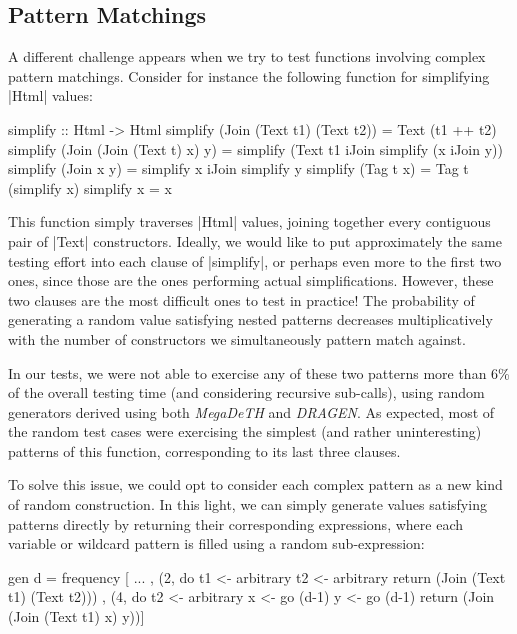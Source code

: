 %
\subsection{Pattern Matchings}

A different challenge appears when we try to test functions involving complex
pattern matchings. Consider for instance the following function for simplifying
|Html| values:

\begin{code}
simplify :: Html -> Html
simplify (Join (Text t1) (Text t2)) = Text (t1 ++ t2)
simplify (Join (Join (Text t) x) y)
  = simplify (Text t1 iJoin simplify (x iJoin y))
simplify (Join x y) = simplify x iJoin simplify y
simplify (Tag t x) = Tag t (simplify x)
simplify x = x
\end{code}
%
This function simply traverses |Html| values, joining together every contiguous
pair of |Text| constructors.
%
Ideally, we would like to put approximately the same testing effort into each
clause of |simplify|, or perhaps even more to the first two ones, since those
are the ones performing actual simplifications.
%
However, these two clauses are the most difficult ones to test in practice!
%
The probability of generating a random value satisfying nested patterns
decreases multiplicatively with the number of constructors we simultaneously
pattern match against.


In our tests, we were not able to exercise any of these two patterns more than
6\% of the overall testing time (and considering recursive sub-calls), using
random generators derived using both \emph{MegaDeTH} and \emph{DRAGEN}.
%
As expected, most of the random test cases were exercising the simplest (and
rather uninteresting) patterns of this function, corresponding to its last three
clauses.


To solve this issue, we could opt to consider each complex pattern as a new kind
of random construction.
%
In this light, we can simply generate values satisfying patterns directly by
returning their corresponding expressions, where each variable or wildcard
pattern is filled using a random sub-expression:

\begin{code}
gen d = frequency
  [ ...
  , (2, do  t1  <- arbitrary
            t2  <- arbitrary
            return (Join (Text t1) (Text t2)))
  , (4, do  t2  <- arbitrary
            x   <- go (d-1)
            y   <- go (d-1)
            return (Join (Join (Text t1) x) y))]
\end{code}


